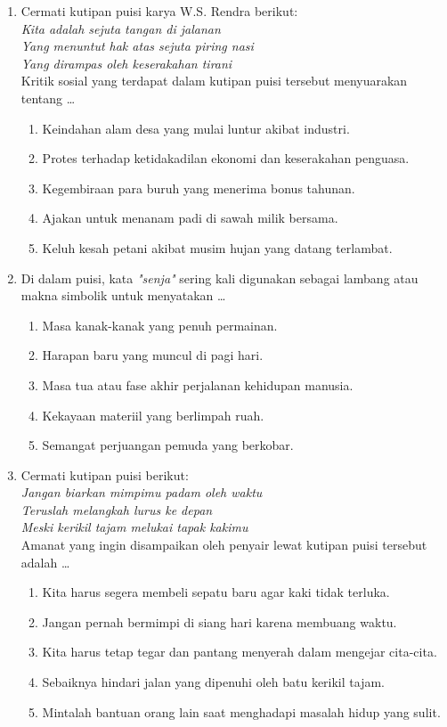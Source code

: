 \documentclass[12pt,a4paper]{article}
\begin{document}
\begin{enumerate}[leftmargin=*]
\item Cermati kutipan puisi karya W.S. Rendra berikut:\\
\textit{Kita adalah sejuta tangan di jalanan}\\
\textit{Yang menuntut hak atas sejuta piring nasi}\\
\textit{Yang dirampas oleh keserakahan tirani}\\
Kritik sosial yang terdapat dalam kutipan puisi tersebut menyuarakan tentang \dots
    \begin{enumerate}[label=\alph*.]
        \item Keindahan alam desa yang mulai luntur akibat industri.
        \item Protes terhadap ketidakadilan ekonomi dan keserakahan penguasa.
        \item Kegembiraan para buruh yang menerima bonus tahunan.
        \item Ajakan untuk menanam padi di sawah milik bersama.
        \item Keluh kesah petani akibat musim hujan yang datang terlambat.
    \end{enumerate}

\item Di dalam puisi, kata \textit{"senja"} sering kali digunakan sebagai lambang atau makna simbolik untuk menyatakan \dots
    \begin{enumerate}[label=\alph*.]
        \item Masa kanak-kanak yang penuh permainan.
        \item Harapan baru yang muncul di pagi hari.
        \item Masa tua atau fase akhir perjalanan kehidupan manusia.
        \item Kekayaan materiil yang berlimpah ruah.
        \item Semangat perjuangan pemuda yang berkobar.
    \end{enumerate}

\item Cermati kutipan puisi berikut:\\
\textit{Jangan biarkan mimpimu padam oleh waktu}\\
\textit{Teruslah melangkah lurus ke depan}\\
\textit{Meski kerikil tajam melukai tapak kakimu}\\
Amanat yang ingin disampaikan oleh penyair lewat kutipan puisi tersebut adalah \dots
    \begin{enumerate}[label=\alph*.]
        \item Kita harus segera membeli sepatu baru agar kaki tidak terluka.
        \item Jangan pernah bermimpi di siang hari karena membuang waktu.
        \item Kita harus tetap tegar dan pantang menyerah dalam mengejar cita-cita.
        \item Sebaiknya hindari jalan yang dipenuhi oleh batu kerikil tajam.
        \item Mintalah bantuan orang lain saat menghadapi masalah hidup yang sulit.
    \end{enumerate}


\end{enumerate}
\end{document}
